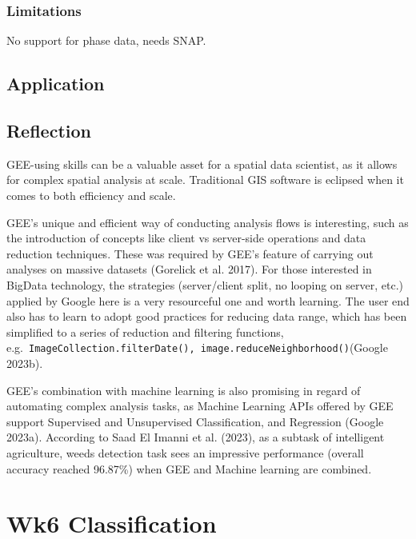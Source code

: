 \documentclass[
  letterpaper,
  DIV=11,
  numbers=noendperiod]{scrreprt}
\begin{document}
\hypertarget{limitations}{%
\subsection{Limitations}\label{limitations}}

No support for phase data, needs SNAP.

\hypertarget{application-1}{%
\section{Application}\label{application-1}}

\hypertarget{reflection-2}{%
\section{Reflection}\label{reflection-2}}

GEE-using skills can be a valuable asset for a spatial data scientist,
as it allows for complex spatial analysis at scale. Traditional GIS
software is eclipsed when it comes to both efficiency and scale.

GEE's unique and efficient way of conducting analysis flows is
interesting, such as the introduction of concepts like client vs
server-side operations and data reduction techniques. These was required
by GEE's feature of carrying out analyses on massive datasets (Gorelick
et al. 2017). For those interested in BigData technology, the strategies
(server/client split, no looping on server, etc.) applied by Google here
is a very resourceful one and worth learning. The user end also has to
learn to adopt good practices for reducing data range, which has been
simplified to a series of reduction and filtering functions,
e.g.~\texttt{ImageCollection.filterDate(),\ image.reduceNeighborhood()}(Google
2023b).

GEE's combination with machine learning is also promising in regard of
automating complex analysis tasks, as Machine Learning APIs offered by
GEE support Supervised and Unsupervised Classification, and Regression
(Google 2023a). According to Saad El Imanni et al. (2023), as a subtask
of intelligent agriculture, weeds detection task sees an impressive
performance (overall accuracy reached 96.87\%) when GEE and Machine
learning are combined.


\hypertarget{wk6-classification}{%
\chapter{Wk6 Classification}\label{wk6-classification}}
\end{document}
